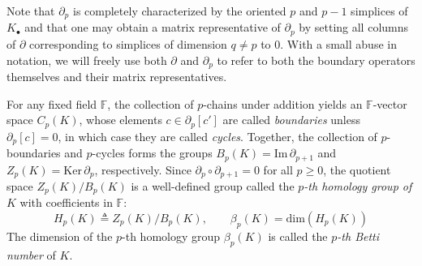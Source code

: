 Note that $\partial_p$ is completely characterized by the oriented $p$ and $p-1$ simplices of $K_\bullet$ and that one may obtain a matrix representative of $\partial_p$ by setting all columns of $\partial$ corresponding to simplices of dimension $q \neq p$ to $0$. 
With a small abuse in notation, we will freely use both $\partial$ and $\partial_p$ to refer to both the boundary operators themselves and their matrix representatives.

For any fixed field $\mathbb{F}$, the collection of $p$-chains under addition yields an $\mathbb{F}$-vector space $C_p(K)$, whose elements $c \in \partial_p[c']$ are called \emph{boundaries} unless $\partial_p[c] = 0$, in which case they are called \emph{cycles}.
 Together, the collection of $p$-boundaries and $p$-cycles forms the groups $B_p(K) = \mathrm{Im}\,\partial_{p+1}$ and $Z_p(K) = \mathrm{Ker}\,\partial_p$, respectively. Since $\partial_p \circ \partial_{p+1} = 0$ for all $p\geq 0$, the quotient space $Z_p(K) / B_{p}(K)$ is a well-defined group called the \emph{$p$-th homology group of $K$} with coefficients in $\mathbb{F}$:
 \begin{equation}
 	H_p(K) \triangleq Z_p(K) / B_{p}(K), \quad \quad \beta_p(K) = \mathrm{dim}(H_p(K))
 \end{equation}
 The dimension of the $p$-th homology group $\beta_p(K)$ is called the \emph{$p$-th Betti number} of $K$.




